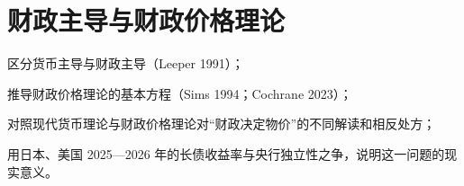 \chapter{财政主导与财政价格理论}\label{ch:fiscaldominance}

\begin{chapterguide}
\begin{guidegoals}
\item 区分货币主导与财政主导（Leeper 1991）；
\item 推导财政价格理论的基本方程（Sims 1994；Cochrane 2023）；
\item 对照现代货币理论与财政价格理论对“财政决定物价”的不同解读和相反处方；
\item 用日本、美国 2025—2026 年的长债收益率与央行独立性之争，说明这一问题的现实意义。
\end{guidegoals}
\end{chapterguide}

\chapterstub
